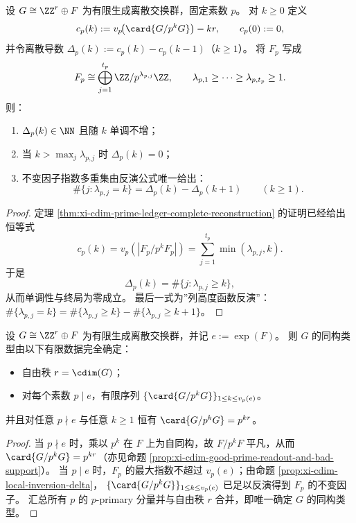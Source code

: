 \begin{proposition}\label{prop:xi-cdim-local-inversion-delta}
设 \(G\cong \ZZ^{r}\oplus F\) 为有限生成离散交换群，固定素数 \(p\)。
对 \(k\ge 0\) 定义
\[
c_p(k):=v_p\!\bigl(\card{G/p^kG}\bigr)-kr,\qquad c_p(0):=0,
\]
并令离散导数 \(\Delta_p(k):=c_p(k)-c_p(k-1)\)（\(k\ge 1\)）。
将 \(F_p\) 写成
\[
F_p\cong \bigoplus_{j=1}^{t_p}\ZZ/p^{\lambda_{p,j}}\ZZ,\qquad
\lambda_{p,1}\ge\cdots\ge \lambda_{p,t_p}\ge 1.
\]
则：
\begin{enumerate}
  \item \(\Delta_p(k)\in\NN\) 且随 \(k\) 单调不增；
  \item 当 \(k>\max_j\lambda_{p,j}\) 时 \(\Delta_p(k)=0\)；
  \item 不变因子指数多重集由反演公式唯一给出：
  \[
  \#\{j:\lambda_{p,j}=k\}=\Delta_p(k)-\Delta_p(k+1)\qquad(k\ge 1).
  \]
\end{enumerate}
\end{proposition}
\begin{proof}
定理 \ref{thm:xi-cdim-prime-ledger-complete-reconstruction} 的证明已经给出恒等式
\[
c_p(k)=v_p(|F_p/p^kF_p|)=\sum_{j=1}^{t_p}\min(\lambda_{p,j},k).
\]
于是
\[
\Delta_p(k)=\#\{j:\lambda_{p,j}\ge k\},
\]
从而单调性与终局为零成立。
最后一式为”列高度函数反演”：\(\#\{\lambda_{p,j}=k\}=\#\{\lambda_{p,j}\ge k\}-\#\{\lambda_{p,j}\ge k+1\}\)。
\end{proof}

\begin{proposition}[有限局部数据的充分性]\label{prop:xi-cdim-finite-data-suffices}
设 \(G\cong \ZZ^{r}\oplus F\) 为有限生成离散交换群，并记 \(e:=\exp(F)\)。
则 \(G\) 的同构类型由以下有限数据完全确定：
\begin{itemize}
  \item 自由秩 \(r=\cdim(G)\)；
  \item 对每个素数 \(p\mid e\)，有限序列 \(\{\card{G/p^kG}\}_{1\le k\le v_p(e)}\)。
\end{itemize}
并且对任意 \(p\nmid e\) 与任意 \(k\ge 1\) 恒有 \(\card{G/p^kG}=p^{kr}\)。
\end{proposition}
\begin{proof}
当 \(p\nmid e\) 时，乘以 \(p^k\) 在 \(F\) 上为自同构，故 \(F/p^kF\) 平凡，从而
\(\card{G/p^kG}=p^{kr}\)（亦见命题 \ref{prop:xi-cdim-good-prime-readout-and-bad-support}）。
当 \(p\mid e\) 时，\(F_p\) 的最大指数不超过 \(v_p(e)\)；由命题 \ref{prop:xi-cdim-local-inversion-delta}，
\(\{\card{G/p^kG}\}_{1\le k\le v_p(e)}\) 已足以反演得到 \(F_p\) 的不变因子。
汇总所有 \(p\) 的 \(p\)-primary 分量并与自由秩 \(r\) 合并，即唯一确定 \(G\) 的同构类型。
\end{proof}

